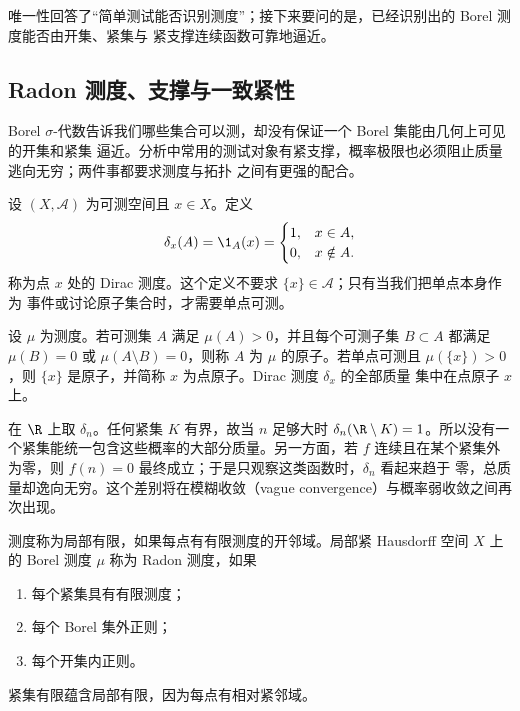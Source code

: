 唯一性回答了“简单测试能否识别测度”；接下来要问的是，已经识别出的 Borel 测度能否由开集、紧集与
紧支撑连续函数可靠地逼近。

\subsection{Radon 测度、支撑与一致紧性}\label{subsec:2-2-2}

Borel $\sigma$-代数告诉我们哪些集合可以测，却没有保证一个 Borel 集能由几何上可见的开集和紧集
逼近。分析中常用的测试对象有紧支撑，概率极限也必须阻止质量逃向无穷；两件事都要求测度与拓扑
之间有更强的配合。

\begin{definition}[Dirac 测度]\label{def:dirac-measure}
设 $(X,\mathcal A)$ 为可测空间且 $x\in X$。定义
\[
 \delta_x(A)=\1_A(x)=
 \begin{cases}1,&x\in A,\\0,&x\notin A.
 \end{cases}
\]
称为点 $x$ 处的 Dirac 测度。这个定义不要求 $\{x\}\in\mathcal A$；只有当我们把单点本身作为
事件或讨论原子集合时，才需要单点可测。
\end{definition}

\begin{definition}[原子]\label{def:measure-atom}
设 $\mu$ 为测度。若可测集 $A$ 满足 $\mu(A)>0$，并且每个可测子集 $B\subset A$ 都满足
$\mu(B)=0$ 或 $\mu(A\setminus B)=0$，则称 $A$ 为 $\mu$ 的原子。若单点可测且
$\mu(\{x\})>0$，则 $\{x\}$ 是原子，并简称 $x$ 为点原子。Dirac 测度 $\delta_x$ 的全部质量
集中在点原子 $x$ 上。
\end{definition}

\begin{example}[质量逃向无穷]\label{ex:2-2-2-3}
在 $\R$ 上取 $\delta_n$。任何紧集 $K$ 有界，故当 $n$ 足够大时
$\delta_n(\R\setminus K)=1$。所以没有一个紧集能统一包含这些概率的大部分质量。另一方面，若
$f$ 连续且在某个紧集外为零，则 $f(n)=0$ 最终成立；于是只观察这类函数时，$\delta_n$ 看起来趋于
零，总质量却逸向无穷。这个差别将在模糊收敛（vague convergence）与概率弱收敛之间再次出现。
\end{example}

\begin{definition}[Radon 测度]\label{def:2-2-2-1}
测度称为局部有限，如果每点有有限测度的开邻域。局部紧 Hausdorff 空间 $X$ 上的 Borel 测度
$\mu$ 称为 Radon 测度，如果
\begin{enumerate}
 \item 每个紧集具有有限测度；
 \item 每个 Borel 集外正则；
 \item 每个开集内正则。
\end{enumerate}
紧集有限蕴含局部有限，因为每点有相对紧邻域。
\end{definition}

